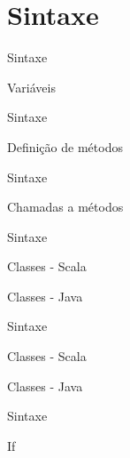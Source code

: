 \section{Sintaxe}

\begin{frame}{Sintaxe}
	\begin{block}{Variáveis}
		
	\end{block}
\end{frame}

\begin{frame}{Sintaxe}
	\begin{block}{Definição de métodos}
		 
	\end{block}
\end{frame}

\begin{frame}{Sintaxe}
	\begin{block}{Chamadas a métodos}
		 
	\end{block}
\end{frame}

\begin{frame}{Sintaxe}
	\begin{block}{Classes - Scala}
		
	\end{block}
	
	\begin{block}{Classes - Java}
		 
	\end{block}
\end{frame}

\begin{frame}{Sintaxe}
	\begin{block}{Classes - Scala}
		 
	\end{block}
	
	\begin{block}{Classes - Java}
		 
	\end{block}
\end{frame}

\begin{frame}{Sintaxe}
	\begin{block}{If}
		 
	\end{block}
\end{frame}

